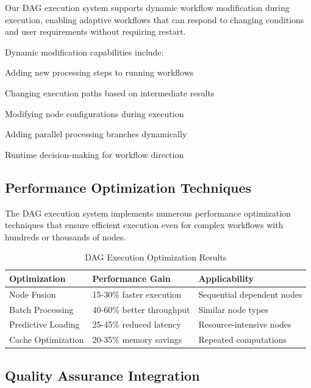 Our DAG execution system supports dynamic workflow modification during execution, enabling adaptive workflows that can respond to changing conditions and user requirements without requiring restart.

Dynamic modification capabilities include:

\begin{description}[leftmargin=4cm,labelwidth=3.5cm]
    \item[\textbf{Node Addition}] Adding new processing steps to running workflows
    \item[\textbf{Path Modification}] Changing execution paths based on intermediate results
    \item[\textbf{Parameter Updates}] Modifying node configurations during execution
    \item[\textbf{Branch Insertion}] Adding parallel processing branches dynamically
    \item[\textbf{Conditional Routing}] Runtime decision-making for workflow direction
\end{description}

\subsection*{Performance Optimization Techniques}

The DAG execution system implements numerous performance optimization techniques that ensure efficient execution even for complex workflows with hundreds or thousands of nodes.

\begin{table}[ht]
\centering
\begin{tabular}{@{}lll@{}}
\toprule
\textbf{Optimization} & \textbf{Performance Gain} & \textbf{Applicability} \\
\midrule
Node Fusion & 15-30\% faster execution & Sequential dependent nodes \\
Batch Processing & 40-60\% better throughput & Similar node types \\
Predictive Loading & 25-45\% reduced latency & Resource-intensive nodes \\
Cache Optimization & 20-35\% memory savings & Repeated computations \\
\bottomrule
\end{tabular}
\caption{DAG Execution Optimization Results}
\end{table}

\subsection*{Quality Assurance Integration}


